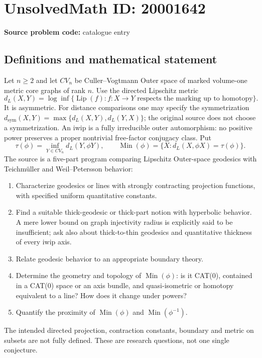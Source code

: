 \documentclass[11pt]{article}
\begin{document}
\section*{UnsolvedMath ID: 20001642}
\textbf{Source problem code:} catalogue entry
\subsection{Definitions and mathematical statement}
Let \(n\geq2\) and let \(CV_n\) be Culler--Vogtmann Outer space of marked volume-one metric core graphs of rank \(n\). Use the directed Lipschitz metric
\[
 d_L(X,Y)=\log\inf\{\operatorname{Lip}(f):f:X\to Y
 \text{ respects the marking up to homotopy}\}.
\]
It is asymmetric. For distance comparisons one may specify the symmetrization \(d_{\mathrm{sym}}(X,Y)=\max\{d_L(X,Y),d_L(Y,X)\}\); the original source does not choose a symmetrization. An iwip is a fully irreducible outer automorphism: no positive power preserves a proper nontrivial free-factor conjugacy class. Put
\[
 \tau(\phi)=\inf_{Y\in CV_n}d_L(Y,\phi Y),\qquad
 \operatorname{Min}(\phi)=\{X:d_L(X,\phi X)=\tau(\phi)\}.
\]
The source is a five-part program comparing Lipschitz Outer-space geodesics with Teichm\"uller and Weil--Petersson behavior:
\begin{enumerate}
\item Characterize geodesics or lines with strongly contracting projection functions, with specified uniform quantitative constants.
\item Find a suitable thick-geodesic or thick-part notion with hyperbolic behavior. A mere lower bound on graph injectivity radius is explicitly said to be insufficient; ask also about thick-to-thin geodesics and quantitative thickness of every iwip axis.
\item Relate geodesic behavior to an appropriate boundary theory.
\item Determine the geometry and topology of \(\operatorname{Min}(\phi)\): is it CAT(0), contained in a CAT(0) space or an axis bundle, and quasi-isometric or homotopy equivalent to a line? How does it change under powers?
\item Quantify the proximity of \(\operatorname{Min}(\phi)\) and \(\operatorname{Min}(\phi^{-1})\).
\end{enumerate}
The intended directed projection, contraction constants, boundary and metric on subsets are not fully defined. These are research questions, not one single conjecture.
\end{document}
